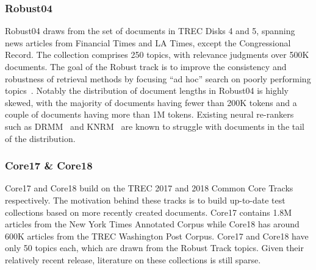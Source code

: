 \subsubsection{Robust04}

Robust04 draws from the set of documents in TREC Disks 4 and 5, spanning news articles from Financial Times and LA Times, except the Congressional Record.
The collection comprises 250 topics, with relevance judgments over 500K documents.
The goal of the Robust track is to improve the consistency and robustness of retrieval methods by focusing ``ad hoc'' search on poorly performing topics~\cite{Voorhees_TREC2004_robust}.
Notably the distribution of document lengths in Robust04 is highly skewed, with the majority of documents having fewer than 200K tokens and a couple of documents having more than 1M tokens.
Existing neural re-rankers such as DRMM~\cite{guo2016deep} and KNRM~\cite{xiong2017knrm} are known to struggle with documents in the tail of the distribution.

\subsubsection{Core17 \& Core18}

Core17 and Core18 build on the TREC 2017 and 2018 Common Core Tracks respectively.
The motivation behind these tracks is to build up-to-date test collections based on more recently created documents.
Core17 contains 1.8M articles from the New York Times Annotated Corpus while Core18 has around 600K articles from the TREC Washington Post Corpus.
Core17 and Core18 have only 50 topics each, which are drawn from the Robust Track topics.
Given their relatively recent release, literature on these collections is still sparse.